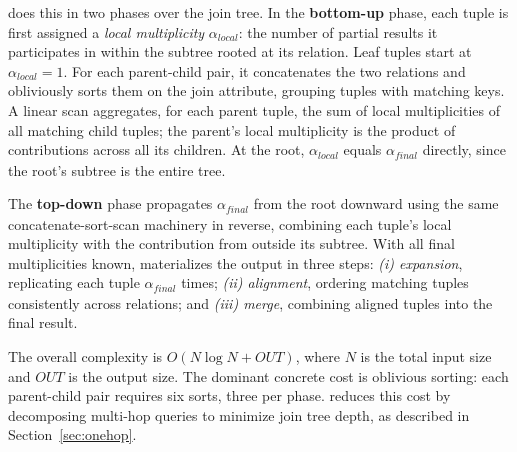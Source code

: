 \Wei does this in two phases over the join tree. In the \textbf{bottom-up}
phase, each tuple is first assigned a \emph{local multiplicity}
$\alpha_{\mathit{local}}$: the number of partial results it participates
in within the subtree rooted at its relation. Leaf tuples start at
$\alpha_{\mathit{local}} = 1$. For each parent-child pair, it concatenates
the two relations and obliviously sorts them on the join attribute,
grouping tuples with matching keys. A linear scan aggregates, for each
parent tuple, the sum of local multiplicities of all matching child
tuples; the parent's local multiplicity is the product of contributions
across all its children. At the root, $\alpha_{\mathit{local}}$
equals $\alpha_{\mathit{final}}$ directly, since the root's subtree
is the entire tree.

The \textbf{top-down} phase propagates $\alpha_{\mathit{final}}$ from
the root downward using the same concatenate-sort-scan machinery in
reverse, combining each tuple's local multiplicity with the contribution
from outside its subtree. With all final multiplicities known, \wei
materializes the output in three steps: \emph{(i) expansion}, replicating
each tuple $\alpha_{\mathit{final}}$ times; \emph{(ii) alignment},
ordering matching tuples consistently across relations; and \emph{(iii)
merge}, combining aligned tuples into the final result.


The overall complexity is $O(N \log N + \mathit{OUT})$, where $N$ is the total 
input size and $\mathit{OUT}$ is the output size.  The dominant concrete cost is 
oblivious sorting: each parent-child pair requires six sorts, three per 
phase. \system reduces this cost by decomposing multi-hop queries to minimize 
join tree depth, as described in Section~\ref{sec:onehop}.